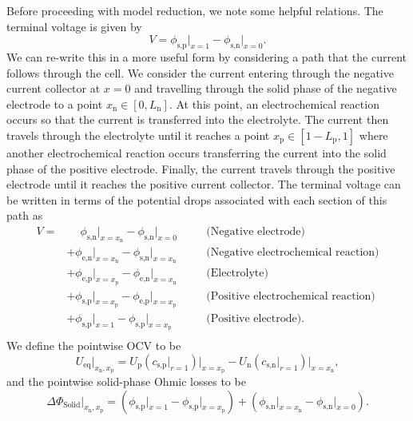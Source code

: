 \documentclass[a4paper]{article}
\newcommand{\add}{\color{black}}
\newcommand{\ts}[1]{_{\text{#1}}}
\begin{document}
Before proceeding with model reduction, we note some helpful relations. The terminal voltage is given by
\begin{equation}
  V = \phi\ts{s,p}\big|_{x=1} - \phi\ts{s,n}\big|_{x=0}.
\end{equation}
We can re-write this in a more useful form by considering a \deleted{general}{\add particular} path {\add that the} current follows through the cell. We consider the current entering through the negative current collector at $x=0$ and travelling through the solid phase of the negative electrode to a point $x\ts{n}\in[0,L\ts{n}]$. At this point, an electrochemical reaction occurs so that the current is transferred into the electrolyte. The current then travels through the electrolyte until it reaches a point $x\ts{p}\in[1-L\ts{p}, 1]$ where another electrochemical reaction occurs transferring the current into the solid phase of the positive electrode. Finally, the current travels through the positive electrode until it reaches the positive current collector. The terminal voltage can be written in terms of the potential drops associated with each section of this path as
\begin{equation}\label{eqn:expanded-voltage}
  \begin{aligned}
  V =& \phantom{+}  \phi\ts{s,n}\big|_{x=x\ts{n}} - \phi\ts{s,n}\big|_{x=0} \quad &&\text{(Negative electrode)} \\
      &+ \phi\ts{e,n}\big|_{x=x\ts{n}} - \phi\ts{s,n}\big|_{x=x\ts{n}} \quad && \text{(Negative electrochemical reaction)} \\
      &+ \phi\ts{e,p}\big|_{x=x\ts{p}} - \phi\ts{e,n}\big|_{x=x\ts{n}} \quad && \text{(Electrolyte)} \\
      &+ \phi\ts{s,p}\big|_{x=x\ts{p}} - \phi\ts{e,p}\big|_{x=x\ts{p}} \quad && \text{(Positive electrochemical reaction)} \\
      &+ \phi\ts{s,p}\big|_{x=1} - \phi\ts{s,p}\big|_{x=x\ts{p}} \quad && \text{(Positive electrode).} \\
  \end{aligned}
\end{equation}
We define the pointwise OCV to be
\begin{equation}
    U\ts{eq}\big|_{x\ts{n},x\ts{p}} = U\ts{p}(c\ts{s,p}\big|_{r=1})\big|_{x=x\ts{p}} - U\ts{n}(c\ts{s,n}\big|_{r=1})\big|_{x=x\ts{n}},
\end{equation}
and the pointwise solid-phase Ohmic losses to be
\begin{equation}
  \Delta \Phi\ts{Solid}\big|_{x\ts{n},x\ts{p}} = 
        \left(\phi\ts{s,p}\big|_{x=1} - \phi\ts{s,p}\big|_{x=x\ts{p}} \right) + \left(\phi\ts{s,n}\big|_{x=x\ts{n}} - \phi\ts{s,n}\big|_{x=0}\right).
\end{equation}
\end{document}
